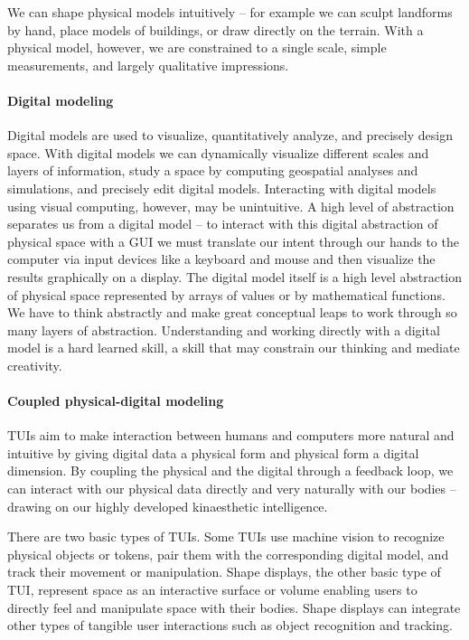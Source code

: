 \documentclass{article}
\begin{document}
We can shape physical models intuitively --
for example we can sculpt landforms by hand, place models of buildings, or draw directly on the terrain.
With a physical model, however, we are constrained to a single scale, simple measurements, and largely qualitative impressions. 

\paragraph{Digital modeling}
Digital models are used to visualize, quantitatively analyze, and precisely design space. 
With digital models we can dynamically visualize different scales and layers of information, 
study a space by computing geospatial analyses and simulations,
and precisely edit digital models.
Interacting with digital models using visual computing, however, may be unintuitive.
A high level of abstraction separates us from a digital model -- 
to interact with this digital abstraction of physical space
with a GUI we must translate
our intent through our hands to the computer via input devices like a keyboard and mouse 
and then visualize the results  graphically on a display. 
The digital model itself is a high level abstraction of physical space represented by arrays of values or by mathematical functions. 
We have to think abstractly and make great conceptual leaps to work through so many layers of abstraction. 
Understanding and working directly with a digital model is a hard learned skill, 
a skill that may constrain our thinking and mediate creativity. 

\paragraph{Coupled physical-digital modeling}
TUIs aim to make interaction between humans and computers more natural and intuitive
by giving digital data a physical form and physical form a digital dimension. 
By coupling the physical and the digital through a feedback loop, 
we can interact with our physical data directly and very naturally with our bodies -- 
drawing on our highly developed kinaesthetic intelligence.  

There are two basic types of TUIs.
Some TUIs use machine vision to recognize physical objects or tokens, pair them with the corresponding digital model, and track their movement or manipulation. 
Shape displays, the other basic type of TUI, represent space as an interactive surface or volume enabling users 
to directly feel and manipulate space with their bodies. 
Shape displays can integrate other types of tangible user interactions such as object recognition and tracking.
\end{document}
